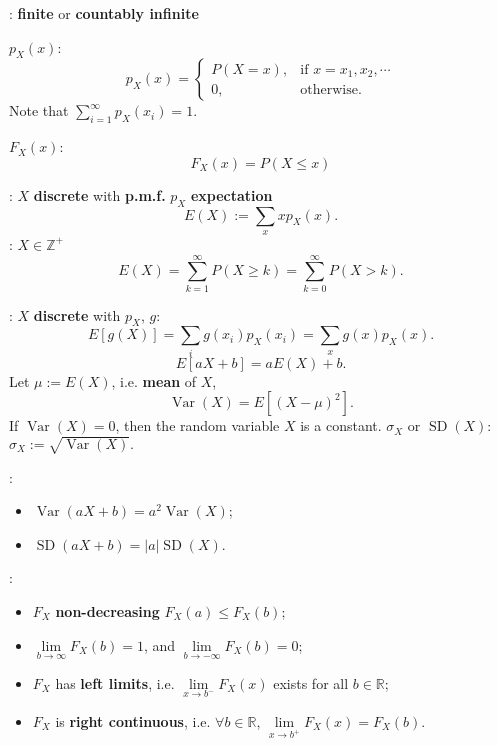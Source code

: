 : \textbf{finite} or \textbf{countably infinite}

 \(p_X(x)\):
\begin{equation*}
p_X(x) = \begin{cases}P(X=x), & \text{if }x = x_1, x_2, \cdots \\ 0, & 
\text{otherwise}.\end{cases}
\end{equation*}
Note that \(\sum\limits_{i=1}^{\infty}p_X(x_i) = 1\).

 \(F_X(x)\):
\[F_X(x) = P(X \leq x)\]

: \(X\) \textbf{discrete} with \textbf{p.m.f.}
\(p_X\) \tf \textbf{expectation}
\begin{equation*}
  E(X) := \sum\limits_{x}xp_X(x).
\end{equation*}
: \(X \in \mathbb{Z}^+\) \tf
\begin{equation*}
E(X) = \sum\limits_{k=1}^{\infty}P(X \geq k) = 
\sum\limits_{k=0}^{\infty}P(X > k).
\end{equation*}

: \(X\) \textbf{discrete} with \(p_X\),
\(g\):
\begin{equation*}
  E[g(X)] = \sum_i g(x_i)p_X(x_i) = \sum_x g(x)p_X(x).
\end{equation*}
\[E[aX + b] = aE(X)+ b.\]
 Let \(\mu := E(X)\), i.e. \textbf{mean} of \(X\),
\[ \operatorname{Var}\left(X\right)=E[(X-\mu)^2]. \]
 If \(\operatorname{Var}\left(X\right) = 0\), then the
random variable \(X\) is a constant.
\(\sigma_X\) or \(\operatorname{SD}\left(X\right)\):
\(\sigma_X := \sqrt{\operatorname{Var}\left(X\right)}.\)

: 
\begin{multicols}{2}
\begin{itemize}
  \item \(\operatorname{Var}\left(aX+b\right)=a^2\operatorname{Var}
    \left(X\right)\);
  \item \(\operatorname{SD}\left(aX+b\right)=|a|\operatorname{SD}
    \left(X\right)\).
\end{itemize}
\end{multicols}

:
\begin{itemize}
  \item \(F_X\) \textbf{non-decreasing} \tf \(F_X(a) \leq F_X(b)\);
  \item \(\lim\limits_{b\rightarrow \infty}F_X(b) = 1\), and
    \(\lim\limits_{b\rightarrow -\infty}F_X(b) = 0\);
  \item \(F_X\) has \textbf{left limits}, i.e. \(\lim\limits_{x\rightarrow
    b^-}F_X(x)\) exists for all \(b\in \mathbb{R}\);
  \item \(F_X\) is \textbf{right continuous}, i.e. \(\forall b \in
    \mathbb{R}\), \(\lim\limits_{x\rightarrow b^+}F_X(x) = F_X(b)\).
\end{itemize}

